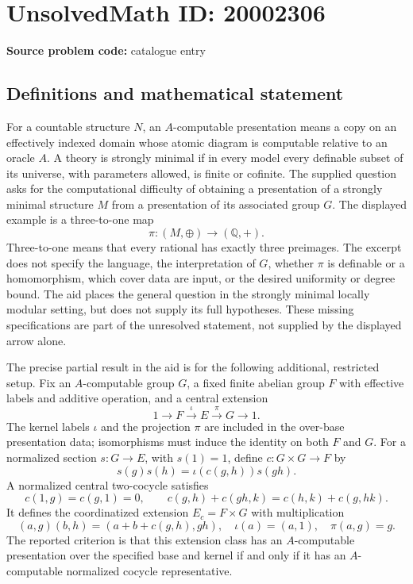 \documentclass[11pt]{article}
\newcommand{\Q}{\mathbb{Q}}
\begin{document}
\section*{UnsolvedMath ID: 20002306}
\textbf{Source problem code:} catalogue entry
\subsection{Definitions and mathematical statement}
For a countable structure \(N\), an \(A\)-computable presentation means a copy on an effectively indexed domain whose atomic diagram is computable relative to an oracle \(A\). A theory is strongly minimal if in every model every definable subset of its universe, with parameters allowed, is finite or cofinite. The supplied question asks for the computational difficulty of obtaining a presentation of a strongly minimal structure \(M\) from a presentation of its associated group \(G\). The displayed example is a three-to-one map
\[
 \pi:(M,\oplus)\longrightarrow(\Q,+).
\]
Three-to-one means that every rational has exactly three preimages. The excerpt does not specify the language, the interpretation of \(G\), whether \(\pi\) is definable or a homomorphism, which cover data are input, or the desired uniformity or degree bound. The aid places the general question in the strongly minimal locally modular setting, but does not supply its full hypotheses. These missing specifications are part of the unresolved statement, not supplied by the displayed arrow alone.

The precise partial result in the aid is for the following additional, restricted setup. Fix an \(A\)-computable group \(G\), a fixed finite abelian group \(F\) with effective labels and additive operation, and a central extension
\[
 1\longrightarrow F\xrightarrow{\iota}E\xrightarrow{\pi}G\longrightarrow1.
\]
The kernel labels \(\iota\) and the projection \(\pi\) are included in the over-base presentation data; isomorphisms must induce the identity on both \(F\) and \(G\). For a normalized section \(s:G\to E\), with \(s(1)=1\), define \(c:G\times G\to F\) by
\[
 s(g)s(h)=\iota(c(g,h))s(gh).
\]
A normalized central two-cocycle satisfies
\[
 c(1,g)=c(g,1)=0,\qquad
 c(g,h)+c(gh,k)=c(h,k)+c(g,hk).
\]
It defines the coordinatized extension \(E_c=F\times G\) with multiplication
\[
 (a,g)(b,h)=(a+b+c(g,h),gh),\quad
 \iota(a)=(a,1),\quad\pi(a,g)=g.
\]
The reported criterion is that this extension class has an \(A\)-computable presentation over the specified base and kernel if and only if it has an \(A\)-computable normalized cocycle representative.
\end{document}
